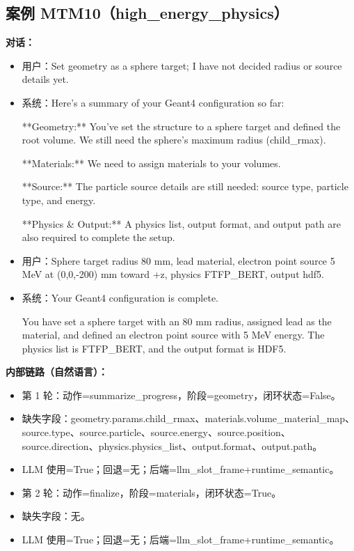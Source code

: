 \documentclass[11pt]{ctexart}
\begin{document}
\subsection{案例 MTM10（high\_energy\_physics）}
\textbf{对话：}
\begin{itemize}
\item 用户：Set geometry as a sphere target; I have not decided radius or source details yet.
\item 系统：Here's a summary of your Geant4 configuration so far:

**Geometry:**  
You've set the structure to a sphere target and defined the root volume. We still need the sphere's maximum radius (child\_rmax).

**Materials:**  
We need to assign materials to your volumes.

**Source:**  
The particle source details are still needed: source type, particle type, and energy.

**Physics \& Output:**  
A physics list, output format, and output path are also required to complete the setup.
\item 用户：Sphere target radius 80 mm, lead material, electron point source 5 MeV at (0,0,-200) mm toward +z, physics FTFP\_BERT, output hdf5.
\item 系统：Your Geant4 configuration is complete.

You have set a sphere target with an 80 mm radius, assigned lead as the material, and defined an electron point source with 5 MeV energy. The physics list is FTFP\_BERT, and the output format is HDF5.
\end{itemize}
\textbf{内部链路（自然语言）：}
\begin{itemize}
\item 第 1 轮：动作=summarize\_progress，阶段=geometry，闭环状态=False。
\item 缺失字段：geometry.params.child\_rmax、materials.volume\_material\_map、source.type、source.particle、source.energy、source.position、source.direction、physics.physics\_list、output.format、output.path。
\item LLM 使用=True；回退=无；后端=llm\_slot\_frame+runtime\_semantic。
\item 第 2 轮：动作=finalize，阶段=materials，闭环状态=True。
\item 缺失字段：无。
\item LLM 使用=True；回退=无；后端=llm\_slot\_frame+runtime\_semantic。
\end{itemize}
\end{document}
